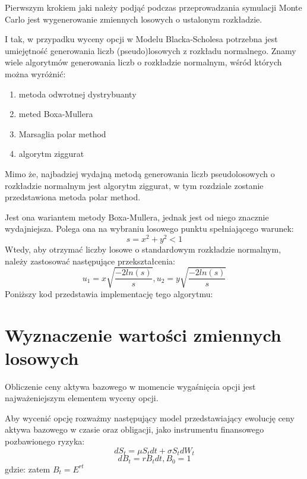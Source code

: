 \documentclass{pracamgr}
\begin{document}
Pierwszym krokiem jaki należy podjąć podczas przeprowadzania symulacji Monte Carlo jest 
wygenerowanie zmiennych losowych o ustalonym rozkładzie.

I tak, w przypadku wyceny opcji w Modelu Blacka-Scholesa potrzebna jest umiejętność generowania liczb (pseudo)losowych z rozkładu normalnego. Znamy wiele algorytmów generowania liczb o rozkładzie normalnym, wśród których można wyróżnić:
\begin{enumerate}
  \item metoda odwrotnej dystrybuanty
  \item meted Boxa-Mullera
  \item Marsaglia polar method
  \item algorytm ziggurat
\end{enumerate}

Mimo że, najbadziej wydajną metodą generowania liczb pseudolosowych o rozkładzie normalnym jest algorytm ziggurat, w tym rozdziale zostanie przedstawiona metoda polar method.

Jest ona wariantem metody Boxa-Mullera, jednak jest od niego znacznie wydajniejsza.
Polega ona na wybraniu losowego punktu spełniającego warunek:
\begin{equation}
  s = x^2 + y^2 < 1
\end{equation}
Wtedy, aby otrzymać liczby losowe o standardowym rozkładzie normalnym, należy zastosować następujące przekształcenia:
\begin{equation}
  u_1 = x \sqrt{\frac{-2ln(s)}{s}}, u_2 = y \sqrt{\frac{-2ln(s)}{s}}
\end{equation}
Poniższy kod przedstawia implementację tego algorytmu:


\section{Wyznaczenie wartości zmiennych losowych}

Obliczenie ceny aktywa bazowego w momencie wygaśnięcia opcji jest najważeniejszym elementem 
wyceny opcji. 

Aby wycenić opcję rozważmy następujący model przedstawiający ewolucję ceny aktywa
bazowego w czasie oraz obligacji, jako instrumentu finansowego pozbawionego ryzyka:
\begin{equation}
  dS_t = \mu S_t dt + \sigma S_t d W_t 
\end{equation}
\begin{equation}
  dB_t = r B_t dt, B_0 = 1
\end{equation}
gdzie:
zatem $B_t = E^{rt}$
\end{document}
